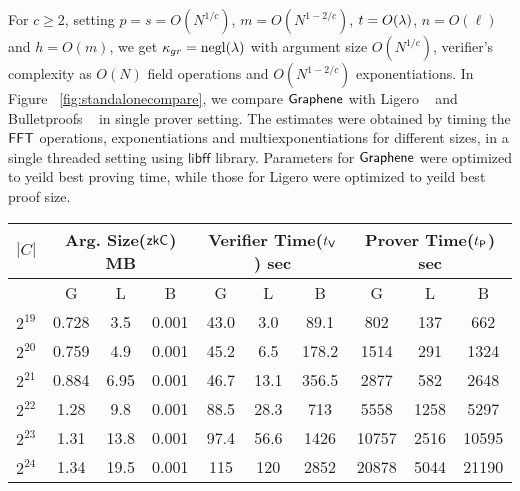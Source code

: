 For $c\geq 2$, setting $p=s=O(N^{1/c})$, $m=O(N^{1-2/c})$, $t=O(\lambda)$,
$n=O(\ell)$ and $h=O(m)$, we get $\kappa_{gr}=\mathrm{negl}(\lambda)$ with argument size
$O(N^{1/c})$, verifier's complexity as $O(N)$ field operations and
$O(N^{1-2/c})$ exponentiations. In Figure ~\ref{fig:standalonecompare}, we compare
$\textsf{Graphene}$ with Ligero ~\cite{ligero} and Bulletproofs ~\cite{Bulletproofs} in
single prover setting. The estimates were obtained by timing the $\mathsf{FFT}$
operations, exponentiations and multiexponentiations for different sizes, in a
single threaded setting using $\mathsf{libff}$ library. Parameters for $\textsf{Graphene}$ were optimized to yeild best
proving time, while those for Ligero were optimized to yeild best proof size.
\begin{figure*}
\centering
\begin{tabular}{|c|c|c|c|c|c|c|c|c|c|}
\hline
$|C|$ & \multicolumn{3}{|c|}{Arg. Size($\mathsf{zkC}$) MB} &
        \multicolumn{3}{|c|}{Verifier Time($t_{\mathsf{V}}$) sec} &
        \multicolumn{3}{|c|}{Prover Time($t_{\mathsf{P}}$) sec} \\
\hline
 & \textsf{G} & \textsf{L} & \textsf{B} &
   \textsf{G} & \textsf{L} & \textsf{B} &
   \textsf{G} & \textsf{L} & \textsf{B} \\
\hline
$2^{19}$ & 0.728 & 3.5 & 0.001 & 43.0 & 3.0 & 89.1 & 802 & 137 & 662 \\
$2^{20}$ & 0.759 & 4.9 & 0.001 & 45.2 & 6.5 & 178.2 & 1514 & 291 & 1324 \\
$2^{21}$ & 0.884 & 6.95 & 0.001 & 46.7 & 13.1 & 356.5 & 2877 & 582 & 2648 \\
$2^{22}$ & 1.28  & 9.8 & 0.001 & 88.5 & 28.3 & 713 & 5558 & 1258 & 5297 \\
$2^{23}$ & 1.31  & 13.8 & 0.001 & 97.4 & 56.6 & 1426 & 10757 & 2516 & 10595 \\
$2^{24}$ & 1.34  & 19.5 & 0.001 & 115 & 120 & 2852 & 20878 & 5044 & 21190 \\
\hline
\end{tabular}
\caption{Comparison of Graphene(G), Ligero(L) and Bulletproofs(B) in single
prover setting for 80 bits of security}
\label{fig:standalonecompare}
\end{figure*}

